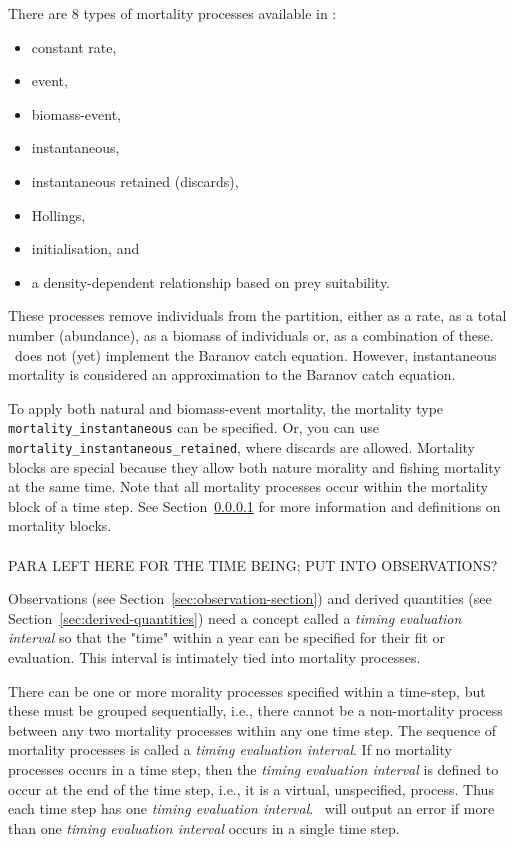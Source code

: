 There are 8 types of mortality processes available in \CNAME:

\begin{itemize}
	\item constant rate,
	\item event,
	\item biomass-event,
	\item instantaneous,
	\item instantaneous retained (discards),
	\item Hollings,
	\item initialisation, and
	\item a density-dependent relationship based on prey suitability.
\end{itemize}

These processes remove individuals from the partition, either as a rate, as a total number (abundance), as a biomass of individuals or, as a combination of these. \CNAME~does not (yet) implement the Baranov catch equation. However, instantaneous mortality is considered an approximation to the Baranov catch equation.

To apply both natural and biomass-event mortality, the mortality type \texttt{mortality\_instantaneous} can be specified. Or, you can use \texttt{mortality\_instantaneous\_retained}, where discards are allowed. Mortality blocks are special because they allow both nature morality and fishing mortality at the same time. Note that all mortality processes occur within the mortality block of a time step. See Section~\ref{sec:mortality_block} for more information and definitions on mortality blocks.


\paragraph{}\label{sec:mortality_block}\label{Timing evaluation interval}

PARA LEFT HERE FOR THE TIME BEING; PUT INTO OBSERVATIONS?

Observations (see Section~\ref{sec:observation-section})  and derived quantities (see Section~\ref{sec:derived-quantities}) need a concept called a \textit{timing evaluation interval} so that the "time" within a year can be specified for their fit or evaluation. This interval is intimately tied into mortality processes.

There can be one or more morality processes specified within a time-step, but these must  be 
 grouped sequentially, i.e., there cannot be a non-mortality process between any two mortality processes within any one time step. The sequence of mortality processes is called a \textit{timing evaluation interval}.  If no mortality processes occurs in a time step, then the \textit{timing evaluation interval} is defined to occur at the end of the time step, i.e., it is a virtual, unspecified,  process. Thus  each time step has one \textit{timing evaluation interval}. 
\CNAME~will output an error if more than one \textit{timing evaluation interval} occurs in a single time step. 

